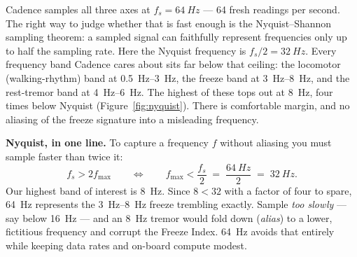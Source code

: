 Cadence samples all three axes at $f_s=\SI{64}{Hz}$ --- 64 fresh readings per second.
The right way to judge whether that is fast enough is the Nyquist--Shannon sampling
theorem: a sampled signal can faithfully represent frequencies only up to half the
sampling rate. Here the Nyquist frequency is $f_s/2 = \SI{32}{Hz}$. Every frequency
band Cadence cares about sits far below that ceiling: the locomotor (walking-rhythm)
band at \SIrange{0.5}{3}{Hz}, the freeze band at \SIrange{3}{8}{Hz}, and the
rest-tremor band at \SIrange{4}{6}{Hz}. The highest of these tops out at \SI{8}{Hz},
four times below Nyquist (Figure~\ref{fig:nyquist}). There is comfortable margin, and
no aliasing of the freeze signature into a misleading frequency.

\begin{mathsbox}
\textbf{Nyquist, in one line.} To capture a frequency $f$ without aliasing you must
sample faster than twice it:
\begin{equation}
f_s > 2 f_{\max}
\qquad\Longleftrightarrow\qquad
f_{\max} < \frac{f_s}{2} \;=\; \frac{\SI{64}{Hz}}{2} \;=\; \SI{32}{Hz}.
\label{eq:nyquist}
\end{equation}
Our highest band of interest is \SI{8}{Hz}. Since $8 < 32$ with a factor of four to
spare, \SI{64}{Hz} represents the \SIrange{3}{8}{Hz} freeze trembling exactly.
Sample \emph{too slowly} --- say below \SI{16}{Hz} --- and an \SI{8}{Hz} tremor would
fold down (\emph{alias}) to a lower, fictitious frequency and corrupt the Freeze
Index. \SI{64}{Hz} avoids that entirely while keeping data rates and on-board compute
modest.
\end{mathsbox}

